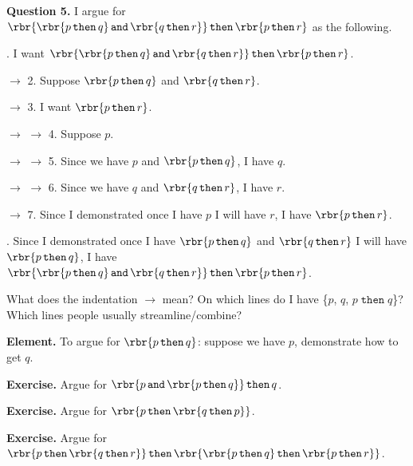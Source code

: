 \documentclass[12pt]{article}
\def\opthen{\mathop{\mathtt{then}}}
\def\opand{\mathop{\mathtt{and}}}
\begin{document}
\hspace{-0.75in} \textbf{Question 5.} I argue for $ \rbr{ \rbr{ p \opthen q } \opand \rbr{ q \opthen r } } \opthen \rbr{ p \opthen r } $ as the following.
\begin{mdframed}
. I want $ \rbr{ \rbr{ p \opthen q } \opand \rbr{ q \opthen r } } \opthen \rbr{ p \opthen r } $.

\noindent $\longrightarrow$ 2. Suppose $ \rbr{ p \opthen q } $ and $ \rbr{ q \opthen r } $.

\noindent $\longrightarrow$ 3. I want $ \rbr{ p \opthen r } $.

\noindent $\longrightarrow$ $\longrightarrow$ 4. Suppose $p$.

\noindent $\longrightarrow$ $\longrightarrow$ 5. Since we have $p$ and $ \rbr{ p \opthen q } $, I have $q$.

\noindent $\longrightarrow$ $\longrightarrow$ 6. Since we have $q$ and $ \rbr{ q \opthen r } $, I have $r$.

\noindent $\longrightarrow$ 7. Since I demonstrated once I have $p$ I will have $r$, I have $ \rbr{ p \opthen r } $.

. Since I demonstrated once I have $ \rbr{ p \opthen q } $ and $ \rbr{ q \opthen r } $ I will have $ \rbr{ p \opthen q } $, I have $ \rbr{ \rbr{ p \opthen q } \opand \rbr{ q \opthen r } } \opthen \rbr{ p \opthen r } $.

\end{mdframed}
What does the indentation $\longrightarrow$ mean? On which lines do I have \{$p$, $q$, $ p \opthen q $\}? Which lines people usually streamline/combine?

\hspace{-0.75in}\llap{$\Box$ } \textbf{Element.} To argue for $ \rbr{ p \opthen q } $: suppose we have $p$, demonstrate how to get $q$.

\leavevmode

\hspace{-0.75in}\llap{> } \textbf{Exercise.} Argue for $ \rbr{ p \opand \rbr{ p \opthen q } } \opthen q $.

\hspace{-0.75in}\llap{> } \textbf{Exercise.} Argue for $ \rbr{ p \opthen \rbr{ q \opthen p } } $.

\hspace{-0.75in}\llap{> } \textbf{Exercise.} Argue for $ \rbr{ p \opthen \rbr{ q \opthen r } } \opthen \rbr{ \rbr{ p \opthen q } \opthen \rbr{ p \opthen r } } $.
\end{document}
